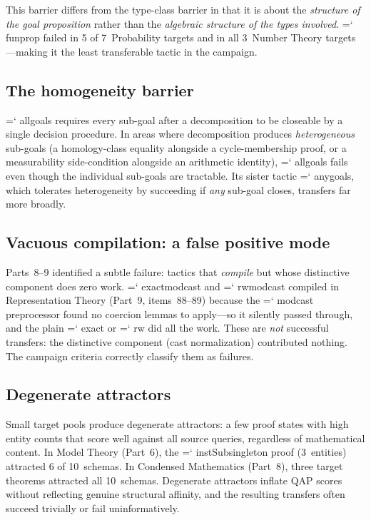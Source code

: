 \documentclass[11pt]{article}
\renewcommand{\texttt}[1]{%
  \begingroup\ttfamily\hyphenchar\font=`\-\relax
  \def\_{\textunderscore\discretionary{}{}{}}%
  #1\endgroup}
\theoremstyle{definition}
\theoremstyle{remark}
\begin{document}
This barrier differs from the type-class barrier in that it is
about the \emph{structure of the goal proposition} rather than the
\emph{algebraic structure of the types involved}.
\texttt{fun\_prop} failed in 5 of 7~Probability targets and in all
3~Number Theory targets---making it the least transferable tactic
in the campaign.

\subsection{The homogeneity barrier}

\texttt{all\_goals} requires every sub-goal after a decomposition
to be closeable by a single decision procedure.  In areas where
decomposition produces \emph{heterogeneous} sub-goals (a
homology-class equality alongside a cycle-membership proof, or a
measurability side-condition alongside an arithmetic identity),
\texttt{all\_goals} fails even though the individual sub-goals are
tractable.  Its sister tactic \texttt{any\_goals}, which tolerates
heterogeneity by succeeding if \emph{any} sub-goal closes,
transfers far more broadly.

\subsection{Vacuous compilation: a false positive mode}

Parts~8--9 identified a subtle failure: tactics that \emph{compile}
but whose distinctive component does zero work.
\texttt{exact\_mod\_cast} and \texttt{rw\_mod\_cast} compiled in
Representation Theory (Part~9, items~88--89) because the
\texttt{mod\_cast} preprocessor found no coercion lemmas to
apply---so it silently passed through, and the plain
\texttt{exact} or \texttt{rw} did all the work.  These are
\emph{not} successful transfers: the distinctive component (cast
normalization) contributed nothing.  The campaign criteria correctly
classify them as failures.

\subsection{Degenerate attractors}

Small target pools produce degenerate attractors: a few proof
states with high entity counts that score well against all source
queries, regardless of mathematical content.  In Model Theory
(Part~6), the \texttt{instSubsingleton} proof (3~entities) attracted
6 of 10~schemas.  In Condensed Mathematics (Part~8), three target
theorems attracted all 10~schemas.  Degenerate attractors inflate
QAP scores without reflecting genuine structural affinity, and
the resulting transfers often succeed trivially or fail
uninformatively.
\end{document}
